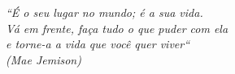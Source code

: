\begin{epigrafe}
    \vspace*{\fill}
	\begin{flushright}
		\textit{``É o seu lugar no mundo; é a sua vida.\\ Vá em frente, faça tudo o que puder com ela\\ e torne-a a vida que você quer viver``\\
		(Mae Jemison)}
	\end{flushright}
\end{epigrafe}
